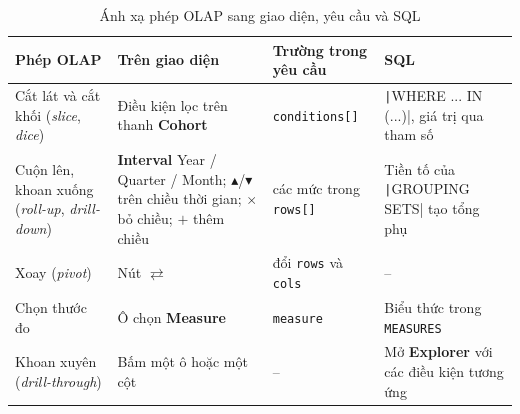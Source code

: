 \begin{table}[H]
	\centering
	\caption{Ánh xạ phép OLAP sang giao diện, yêu cầu và SQL}
	\label{tab:olap-ui}
	\footnotesize
	\begin{tabular}{p{2.6cm} p{4.8cm} p{3cm} p{4.6cm}}
		\toprule
		\textbf{Phép OLAP}                                            & \textbf{Trên giao diện}                                                                                                                 & \textbf{Trường trong yêu cầu}      & \textbf{SQL}                                                                      \\
		\midrule
		Cắt lát và cắt khối (\textit{slice}, \textit{dice})           & Điều kiện lọc trên thanh \textbf{Cohort}                                                                                                & \texttt{conditions[]}              & \texttt|WHERE ... IN (...)|, giá trị qua tham số \\
		Cuộn lên, khoan xuống (\textit{roll-up}, \textit{drill-down}) & \textbf{Interval} Year / Quarter / Month; $\blacktriangle$/$\blacktriangledown$ trên chiều thời gian; $\times$ bỏ chiều; $+$ thêm chiều & các mức trong \texttt{rows[]}      & Tiền tố của \texttt|GROUPING SETS| tạo tổng phụ  \\
		Xoay (\textit{pivot})                                         & Nút $\rightleftarrows$                                                                                                                  & đổi \texttt{rows} và \texttt{cols} & --                                                                                \\
		Chọn thước đo                                                 & Ô chọn \textbf{Measure}                                                                                                                 & \texttt{measure}                   & Biểu thức trong \texttt{MEASURES}                                                 \\
		Khoan xuyên (\textit{drill-through})                          & Bấm một ô hoặc một cột                                                                                                                  & --                                 & Mở \textbf{Explorer} với các điều kiện tương ứng                                  \\
		\bottomrule
	\end{tabular}
\end{table}


